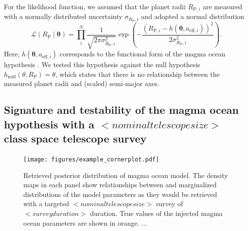 \documentclass[modern]{aastex631}
\begin{document}
For the likelihood function, we assumed that the planet radii $R_{\mathrm{P}, i}$ are measured with a normally distributed uncertainty $\sigma_{R_\mathrm{P}, i}$ and adopted a normal distribution
\begin{equation}
    \mathcal{L}(R_\mathrm{P} \mid \boldsymbol{\theta})=\prod_{i}^{N} \frac{1}{\sqrt{2 \pi \sigma_{R_\mathrm{P}, i}^{2}}} \exp \left(-\frac{\left(R_{\mathrm{P}, i}-h\left(\boldsymbol{\theta}, a_{\mathrm{eff}, i}\right)\right)^{2}}{2 \sigma_{R_\mathrm{P}, i}^{2}}\right).
\end{equation}
Here, $h\left(\boldsymbol{\theta}, a_{\mathrm{eff}, i}\right)$ corresponds to the functional form of the magma ocean hypothesis .
We tested this hypothesis against the null hypothesis $h_\mathrm{null} (\theta, R_\mathrm{P}) = \theta$, which states that there is no relationship between the measured planet radii and (scaled) semi-major axes.

\subsection{Signature and testability of the magma ocean hypothesis with a $<nominal telescope size>$ class space telescope survey}

\begin{figure}[ht!]
    \begin{centering}
        \texttt{[image: figures/example\_cornerplot.pdf]}
        \caption{
        Retrieved posterior distribution of magma ocean model. The density maps in each panel show relationships between and marginalized distributions of the model parameters as they would be retrieved with a targeted $<nominal telescope size>$ survey of $<survey duration>$ duration. True values of the injected magma ocean parameters are shown in orange. ...
        }
        \label{fig:cornerplot}
    \end{centering}
\end{figure}
\end{document}
